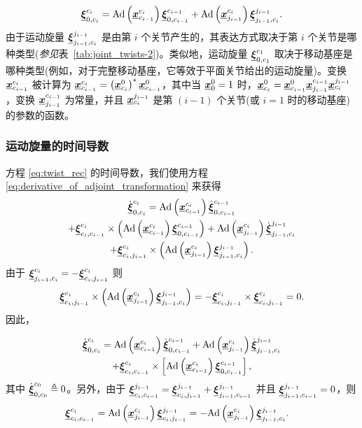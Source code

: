 \begin{equation}
\dq{\xi}_{0,c_{i}}^{c_{i}}=\ad{\dq x_{c_{i-1}}^{c_{i}}}{\dq{\xi}_{0,c_{i-1}}^{c_{i-1}}}+\ad{\dq x_{j_{i-1}}^{c_{i}}}{\dq{\xi}_{j_{i-1},c_{i}}^{j_{i-1}}.}\label{eq:twist_rec}
\end{equation}
由于运动旋量 $\dq{\xi}_{j_{i-1},c_{i}}^{j_{i-1}}$ 是由第 $i$ 个关节产生的，其表达方式取决于第 $i$ 个关节是哪种类型(\emph{参见}表~\ref{tab:joint_twists-2})。类似地，运动旋量 $\dq{\xi}_{0,c_{1}}^{c_{1}}$ 取决于移动基座是哪种类型(例如，对于完整移动基座，它等效于平面关节给出的运动旋量)。变换 $\dq x_{c_{i-1}}^{c_{i}}$ 被计算为 $\dq x_{c_{i-1}}^{c_{i}}=\left(\dq x_{c_{i}}^{0}\right)^{*}\dq x_{c_{i-1}}^{0}$，其中当 $\dq x_{0}^{0}=1$ 时，$\dq x_{c_{i}}^{0}=\dq x_{c_{i-1}}^{0}\dq x_{j_{i-1}}^{c_{i-1}}\dq x_{c_{i}}^{j_{i-1}}$，变换 $\dq x_{j_{i-1}}^{c_{i-1}}$ 为常量，并且 $\dq x_{c_{i}}^{j_{i-1}}$ 是第 $\left(i-1\right)$ 个关节(或 $i=1$ 时的移动基座)的参数的函数。

\subsubsection{\normalfont\bfseries 运动旋量的时间导数 \label{subsec:time_derivative_twists}}

方程 \eqref{eq:twist_rec} 的时间导数，我们使用方程 \eqref{eq:derivative_of_adjoint_transformation} 来获得
\begin{multline*}
\dot{\dq{\xi}}_{0,c_{i}}^{c_{i}}=\ad{\dq x_{c_{i-1}}^{c_{i}}}{\dot{\dq{\xi}}_{0,c_{i-1}}^{c_{i-1}}}\\
+\dq{\xi}_{c_{i},c_{i-1}}^{c_{i}}\times\left(\ad{\dq x_{c_{i-1}}^{c_{i}}}{\dq{\xi}_{0,c_{i-1}}^{c_{i-1}}}\right)+\ad{\dq x_{j_{i-1}}^{c_{i}}}{\dot{\dq{\xi}}_{j_{i-1},c_{i}}^{j_{i-1}}}\\
+\dq{\xi}_{c_{i},j_{i-1}}^{c_{i}}\times\left(\ad{\dq x_{j_{i-1}}^{c_{i}}}{\dq{\xi}_{j_{i-1},c_{i}}^{j_{i-1}}}\right).
\end{multline*}
由于 $\dq{\xi}_{j_{i-1},c_{i}}^{c_{i}}=-\dq{\xi}_{c_{i},j_{i-1}}^{c_{i}}$
则
\[
\dq{\xi}_{c_{i},j_{i-1}}^{c_{i}}\times\left(\ad{\dq x_{j_{i-1}}^{c_{i}}}{\dq{\xi}_{j_{i-1},c_{i}}^{j_{i-1}}}\right)=-\dq{\xi}_{c_{i},j_{i-1}}^{c_{i}}\times\dq{\xi}_{c_{i},j_{i-1}}^{c_{i}}=0.
\]
因此，

\begin{multline}
\dot{\dq{\xi}}_{0,c_{i}}^{c_{i}}=\ad{\dq x_{c_{i-1}}^{c_{i}}}{\dot{\dq{\xi}}_{0,c_{i-1}}^{c_{i-1}}}+\ad{\dq x_{j_{i-1}}^{c_{i}}}{\dot{\dq{\xi}}_{j_{i-1},c_{i}}^{j_{i-1}}}\\
+\dq{\xi}_{c_{i},c_{i-1}}^{c_{i}}\times\left[\ad{\dq x_{c_{i-1}}^{c_{i}}}{\dq{\xi}_{0,c_{i-1}}^{c_{i-1}}}\right],\label{eq:twist_dot_rec}
\end{multline}
其中 $\dot{\dq{\xi}}_{0,c_{0}}^{c_{0}}\triangleq0$。另外，由于
$\dq{\xi}_{c_{i},c_{i-1}}^{j_{i-1}}=\dq{\xi}_{c_{i},j_{i-1}}^{j_{i-1}}+\dq{\xi}_{j_{i-1},c_{i-1}}^{j_{i-1}}$
并且 $\dq{\xi}_{j_{i-1},c_{i-1}}^{j_{i-1}}=0$，则
\begin{align}
\dq{\xi}_{c_{i},c_{i-1}}^{c_{i}} & =\ad{\dq x_{j_{i-1}}^{c_{i}}}{\dq{\xi}_{c_{i},j_{i-1}}^{j_{i-1}}}=-\ad{\dq x_{j_{i-1}}^{c_{i}}}{\dq{\xi}_{j_{i-1},c_{i}}^{j_{i-1}}}.\label{eq:twists_between_adjacent_CoM}
\end{align}

